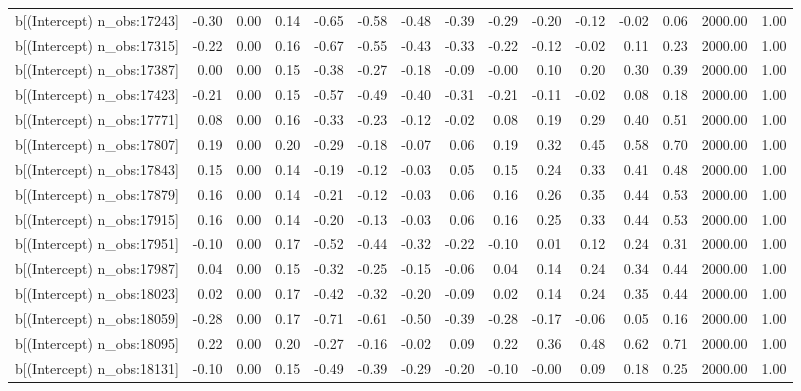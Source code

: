 \begin{table}[ht]
\begin{tabular}{rrrrrrrrrrrrrrr}
  b[(Intercept) n\_obs:17243] & -0.30 & 0.00 & 0.14 & -0.65 & -0.58 & -0.48 & -0.39 & -0.29 & -0.20 & -0.12 & -0.02 & 0.06 & 2000.00 & 1.00 \\ 
  b[(Intercept) n\_obs:17315] & -0.22 & 0.00 & 0.16 & -0.67 & -0.55 & -0.43 & -0.33 & -0.22 & -0.12 & -0.02 & 0.11 & 0.23 & 2000.00 & 1.00 \\ 
  b[(Intercept) n\_obs:17387] & 0.00 & 0.00 & 0.15 & -0.38 & -0.27 & -0.18 & -0.09 & -0.00 & 0.10 & 0.20 & 0.30 & 0.39 & 2000.00 & 1.00 \\ 
  b[(Intercept) n\_obs:17423] & -0.21 & 0.00 & 0.15 & -0.57 & -0.49 & -0.40 & -0.31 & -0.21 & -0.11 & -0.02 & 0.08 & 0.18 & 2000.00 & 1.00 \\ 
  b[(Intercept) n\_obs:17771] & 0.08 & 0.00 & 0.16 & -0.33 & -0.23 & -0.12 & -0.02 & 0.08 & 0.19 & 0.29 & 0.40 & 0.51 & 2000.00 & 1.00 \\ 
  b[(Intercept) n\_obs:17807] & 0.19 & 0.00 & 0.20 & -0.29 & -0.18 & -0.07 & 0.06 & 0.19 & 0.32 & 0.45 & 0.58 & 0.70 & 2000.00 & 1.00 \\ 
  b[(Intercept) n\_obs:17843] & 0.15 & 0.00 & 0.14 & -0.19 & -0.12 & -0.03 & 0.05 & 0.15 & 0.24 & 0.33 & 0.41 & 0.48 & 2000.00 & 1.00 \\ 
  b[(Intercept) n\_obs:17879] & 0.16 & 0.00 & 0.14 & -0.21 & -0.12 & -0.03 & 0.06 & 0.16 & 0.26 & 0.35 & 0.44 & 0.53 & 2000.00 & 1.00 \\ 
  b[(Intercept) n\_obs:17915] & 0.16 & 0.00 & 0.14 & -0.20 & -0.13 & -0.03 & 0.06 & 0.16 & 0.25 & 0.33 & 0.44 & 0.53 & 2000.00 & 1.00 \\ 
  b[(Intercept) n\_obs:17951] & -0.10 & 0.00 & 0.17 & -0.52 & -0.44 & -0.32 & -0.22 & -0.10 & 0.01 & 0.12 & 0.24 & 0.31 & 2000.00 & 1.00 \\ 
  b[(Intercept) n\_obs:17987] & 0.04 & 0.00 & 0.15 & -0.32 & -0.25 & -0.15 & -0.06 & 0.04 & 0.14 & 0.24 & 0.34 & 0.44 & 2000.00 & 1.00 \\ 
  b[(Intercept) n\_obs:18023] & 0.02 & 0.00 & 0.17 & -0.42 & -0.32 & -0.20 & -0.09 & 0.02 & 0.14 & 0.24 & 0.35 & 0.44 & 2000.00 & 1.00 \\ 
  b[(Intercept) n\_obs:18059] & -0.28 & 0.00 & 0.17 & -0.71 & -0.61 & -0.50 & -0.39 & -0.28 & -0.17 & -0.06 & 0.05 & 0.16 & 2000.00 & 1.00 \\ 
  b[(Intercept) n\_obs:18095] & 0.22 & 0.00 & 0.20 & -0.27 & -0.16 & -0.02 & 0.09 & 0.22 & 0.36 & 0.48 & 0.62 & 0.71 & 2000.00 & 1.00 \\ 
  b[(Intercept) n\_obs:18131] & -0.10 & 0.00 & 0.15 & -0.49 & -0.39 & -0.29 & -0.20 & -0.10 & -0.00 & 0.09 & 0.18 & 0.25 & 2000.00 & 1.00 \\ 

\end{tabular}
\end{table}
